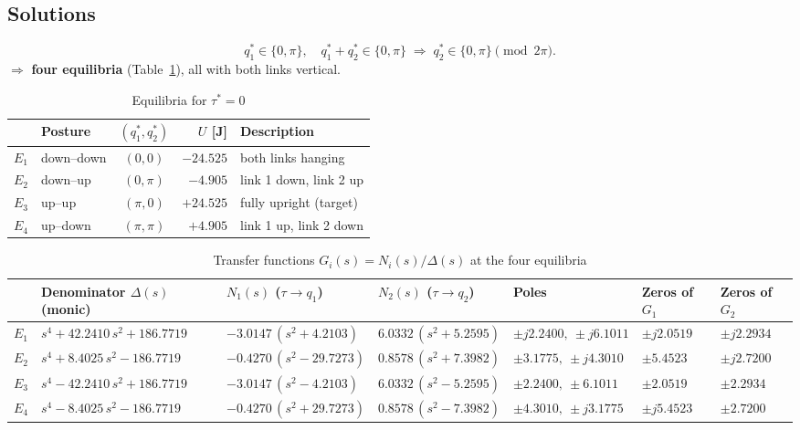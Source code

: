 \documentclass[10pt,twocolumn,letterpaper]{article}
\begin{document}
\subsection{Solutions}
\begin{equation*}
q_1^*\in\{0,\pi\},\quad q_1^*+q_2^*\in\{0,\pi\}\;\Rightarrow\;q_2^*\in\{0,\pi\}\pmod{2\pi}.
\end{equation*}
$\Rightarrow$ \textbf{four equilibria} (Table~\ref{tab:eq}), all with both links vertical.

\begin{table}[h]
\caption{Equilibria for $\tau^*=0$}\label{tab:eq}
\centering\footnotesize\setlength{\tabcolsep}{4pt}
\begin{tabular}{@{}clcrl@{}}
\toprule
 & Posture & $(q_1^*,q_2^*)$ & $U$ [J] & Description\\
\midrule
$E_1$ & down--down & $(0,0)$ & $-24.525$ & both links hanging\\
$E_2$ & down--up & $(0,\pi)$ & $-4.905$ & link 1 down, link 2 up\\
$E_3$ & up--up & $(\pi,0)$ & $+24.525$ & fully upright (target)\\
$E_4$ & up--down & $(\pi,\pi)$ & $+4.905$ & link 1 up, link 2 down\\
\bottomrule
\end{tabular}
\end{table}

\begin{table}[t]
\caption{Transfer functions $G_i(s)=N_i(s)/\Delta(s)$ at the four equilibria}\label{tab:tf}
\centering\footnotesize\setlength{\tabcolsep}{5pt}\renewcommand{\arraystretch}{1.15}
\begin{tabular}{@{}cllllll@{}}
\toprule
 & Denominator $\Delta(s)$ (monic) & $N_1(s)$ \;($\tau\to q_1$) & $N_2(s)$ \;($\tau\to q_2$) & Poles & Zeros of $G_1$ & Zeros of $G_2$\\
\midrule
$E_1$ & $s^4+42.2410\,s^2+186.7719$ & $-3.0147\,(s^2+4.2103)$ & $6.0332\,(s^2+5.2595)$ & $\pm j2.2400,\ \pm j6.1011$ & $\pm j2.0519$ & $\pm j2.2934$\\
$E_2$ & $s^4+8.4025\,s^2-186.7719$ & $-0.4270\,(s^2-29.7273)$ & $0.8578\,(s^2+7.3982)$ & $\pm3.1775,\ \pm j4.3010$ & $\pm5.4523$ & $\pm j2.7200$\\
$E_3$ & $s^4-42.2410\,s^2+186.7719$ & $-3.0147\,(s^2-4.2103)$ & $6.0332\,(s^2-5.2595)$ & $\pm2.2400,\ \pm6.1011$ & $\pm2.0519$ & $\pm2.2934$\\
$E_4$ & $s^4-8.4025\,s^2-186.7719$ & $-0.4270\,(s^2+29.7273)$ & $0.8578\,(s^2-7.3982)$ & $\pm4.3010,\ \pm j3.1775$ & $\pm j5.4523$ & $\pm2.7200$\\
\bottomrule
\end{tabular}
\end{table}
\end{document}
